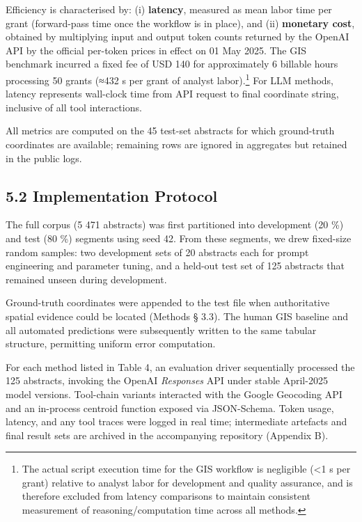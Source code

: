 \documentclass[
  11pt,
]{article}
\begin{document}
Efficiency is characterised by: (i) \textbf{latency}, measured as mean
labor time per grant (forward-pass time once the workflow is in place),
and (ii) \textbf{monetary cost}, obtained by multiplying input and
output token counts returned by the OpenAI API by the official per-token
prices in effect on 01 May 2025. The GIS benchmark incurred a fixed fee
of USD 140 for approximately 6 billable hours processing 50 grants (≈432
s per grant of analyst labor).\footnote{The actual script execution time
  for the GIS workflow is negligible (\textless1 s per grant) relative
  to analyst labor for development and quality assurance, and is
  therefore excluded from latency comparisons to maintain consistent
  measurement of reasoning/computation time across all methods.} For LLM
methods, latency represents wall-clock time from API request to final
coordinate string, inclusive of all tool interactions.

All metrics are computed on the 45 test-set abstracts for which
ground-truth coordinates are available; remaining rows are ignored in
aggregates but retained in the public logs.

\subsection{5.2 Implementation Protocol}\label{implementation-protocol}

The full corpus (5 471 abstracts) was first partitioned into development
(20 \%) and test (80 \%) segments using seed 42. From these segments, we
drew fixed-size random samples: two development sets of 20 abstracts
each for prompt engineering and parameter tuning, and a held-out test
set of 125 abstracts that remained unseen during development.

Ground-truth coordinates were appended to the test file when
authoritative spatial evidence could be located (Methods § 3.3). The
human GIS baseline and all automated predictions were subsequently
written to the same tabular structure, permitting uniform error
computation.

For each method listed in Table 4, an evaluation driver sequentially
processed the 125 abstracts, invoking the OpenAI \emph{Responses} API
under stable April-2025 model versions. Tool-chain variants interacted
with the Google Geocoding API and an in-process centroid function
exposed via JSON-Schema. Token usage, latency, and any tool traces were
logged in real time; intermediate artefacts and final result sets are
archived in the accompanying repository (Appendix B).
\end{document}

